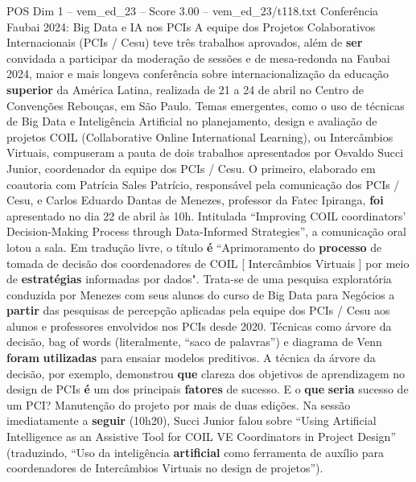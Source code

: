 \begin{textsample}{POS Dim 1 – vem\_ed\_23 – Score 3.00 – vem\_ed\_23/t118.txt}  \label{ex:f1_pos_146}
Conferência Faubai 2024: Big Data e IA nos PCIs A equipe dos Projetos Colaborativos Internacionais (PCIs / Cesu) teve três trabalhos aprovados, além de \textbf{ser} convidada a participar da moderação de sessões e de mesa-redonda na Faubai 2024, maior e mais longeva conferência sobre internacionalização da educação \textbf{superior} da América Latina, realizada de 21 a 24 de abril no Centro de Convenções Rebouças, em São Paulo.
Temas emergentes, como o uso de técnicas de Big Data e Inteligência Artificial no planejamento, design e avaliação de projetos COIL (Collaborative Online International Learning), ou Intercâmbios Virtuais, compuseram a pauta de dois trabalhos apresentados por Osvaldo Succi Junior, coordenador da equipe dos PCIs / Cesu.
O primeiro, elaborado em coautoria com Patrícia Sales Patrício, responsável pela comunicação dos PCIs / Cesu, e Carlos Eduardo Dantas de Menezes, professor da Fatec Ipiranga, \textbf{foi} apresentado no dia 22 de abril às 10h.
Intitulada “Improving COIL coordinators’ Decision-Making Process through Data-Informed Strategies”, a comunicação oral lotou a sala.
Em tradução livre, o título \textbf{é} “Aprimoramento do \textbf{processo} de tomada de decisão dos coordenadores de COIL [ Intercâmbios Virtuais ] por meio de \textbf{estratégias} informadas por dados".
Trata-se de uma pesquisa exploratória conduzida por Menezes com seus alunos do curso de Big Data para Negócios a \textbf{partir} das pesquisas de percepção aplicadas pela equipe dos PCIs / Cesu aos alunos e professores envolvidos nos PCIs desde 2020.
Técnicas como árvore da decisão, bag of words (literalmente, “saco de palavras”) e diagrama de Venn \textbf{foram} \textbf{utilizadas} para ensaiar modelos preditivos.
A técnica da árvore da decisão, por exemplo, demonstrou \textbf{que} clareza dos objetivos de aprendizagem no design de PCIs \textbf{é} um dos principais \textbf{fatores} de sucesso.
E o \textbf{que} \textbf{seria} sucesso de um PCI?
Manutenção do projeto por mais de duas edições.
Na sessão imediatamente a \textbf{seguir} (10h20), Succi Junior falou sobre “Using Artificial Intelligence as an Assistive Tool for COIL VE Coordinators in Project Design” (traduzindo, “Uso da inteligência \textbf{artificial} como ferramenta de auxílio para coordenadores de Intercâmbios Virtuais no design de projetos”).

\end{textsample}
